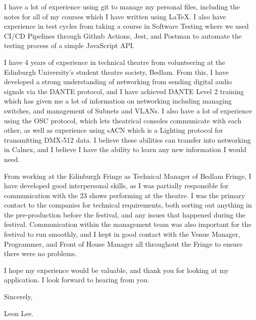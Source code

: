 \documentclass[10pt,english]{article}
\begin{document}
I have a lot of experience using git to manage my personal files, including the notes for all of my courses which I have written using LaTeX. I also have experience in test cycles from taking a course in Software Testing where we used CI/CD Pipelines through Github Actions, Jest, and Postman to automate the testing process of a simple JavaScript API.

\medskip

I have 4 years of experience in technical theatre from volunteering at the Edinburgh University's student theatre society, Bedlam. From this, I have developed a strong understanding of networking from sending digital audio signals via the DANTE protocol, and I have achieved DANTE Level 2 training which has given me a lot of information on networking including managing switches, and management of Subnets and VLANs. I also have a lot of experience using the OSC protocol, which lets theatrical consoles communicate with each other, as well as experience using sACN which is a Lighting protocol for transmitting DMX-512 data. I believe these abilities can transfer into networking in Calnex, and I believe I have the ability to learn any new information I would need.
\medskip

From working at the Edinburgh Fringe as Technical Manager of Bedlam Fringe, I have developed good interpersonal skills, as I was partially responsible for communication with the 23 shows performing at the theatre. I was the primary contact to the companies for technical requirements, both sorting out anything in the pre-production before the festival, and any issues that happened during the festival. Communication within the management team was also important for the festival to run smoothly, and I kept in good contact with the Venue Manager, Programmer, and Front of House Manager all throughout the Fringe to ensure there were no problems.

\medskip

I hope my experience would be valuable, and thank you for looking at my application. I look forward to hearing from you.
\medskip

Sincerely,

Leon Lee.
\end{document}
